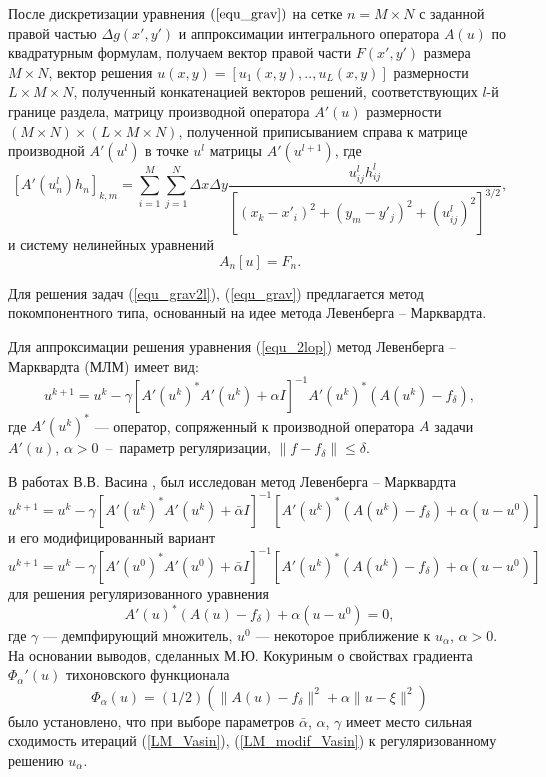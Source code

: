 После дискретизации уравнения $(\ref{equ_grav})$ на сетке $n=M\times N$ с заданной правой частью $\Delta g(x',y')$ и аппроксимации интегрального оператора $A(u)$ по квадратурным формулам, получаем вектор правой части $F(x',y')$ размера  $M\times N$, вектор решения $u(x,y)=[u_1(x,y),..,u_L(x,y)]$ размерности $L\times M\times N$, полученный конкатенацией векторов решений, соответствующих $l$-й границе раздела, матрицу производной оператора $A'(u)$ размерности $(M\times N)\times(L\times M\times N)$, полученной приписыванием справа к матрице производной $A'(u^l)$ в точке $u^l$ матрицы $A'(u^{l+1})$, где
\begin{equation}\label{op_grav_disc_form_mult}
[A'(u_n^l)h_n]_{k,m}=\sum\limits_{i=1}^{M}\sum\limits_{j=1}^{N}
\Delta x\Delta y\frac{u^l_{ij}h^l_{ij}}{[(x_k-x'_i)^2+(y_m-y'_j)^2+(u^l_{ij})^2]^{3/2}},
\end{equation} и систему нелинейных уравнений  
\begin{equation}\label{snl_equ}
A_n[u]=F_n.
\end{equation}

Для решения задач (\ref{equ_grav2l}), (\ref{equ_grav}) предлагается метод покомпонентного типа, основанный на идее метода Левенберга -- Марквардта. 

Для аппроксимации решения уравнения (\ref{equ_2lop}) метод Левенберга -- Марквардта (МЛМ) имеет вид:
\begin{equation}
u^{k+1}=u^k-\gamma[A'(u^k)^*A'(u^k)+\alpha I]^{-1} A'(u^k)^*(A(u^k)-f_\delta),
\end{equation}
где $A'(u^k)^*$ --- оператор, сопряженный к производной оператора $A$ задачи $A'(u)$, $\alpha>0$~--~параметр регуляризации, $\|f-f_\delta\|\le \delta.$
 
В работах В.В. Васина \cite{Vasin_2012}, \cite{VasPer_2011} был исследован метод Левенберга -- Марквардта
\begin{equation}\label{LM_Vasin}
u^{k+1}=u^k-\gamma[A'(u^k)^*A'(u^k)+\bar{\alpha} I]^{-1} [A'(u^k)^*(A(u^k)-f_\delta)+\alpha (u-u^0)]
\end{equation} и его модифицированный вариант
\begin{equation}\label{LM_modif_Vasin}
u^{k+1}=u^k-\gamma[A'(u^0)^*A'(u^0)+\bar{\alpha} I]^{-1} [A'(u^k)^*(A(u^k)-f_\delta)+\alpha (u-u^0)]
\end{equation} для решения регуляризованного уравнения
$$A'(u)^*(A(u)-f_\delta)+	\alpha (u-u^0)=0,$$
где $\gamma$ --- демпфирующий множитель, $u^0$ --- некоторое приближение к $u_\alpha$, $\alpha>0$. На основании выводов, сделанных М.Ю. Кокуриным \cite{Kok_2010} о свойствах градиента $\Phi_\alpha '(u)$ тихоновского функционала $$\Phi_\alpha(u)=(1/2)(\|A(u)-f_\delta\|^2+\alpha\|u-\xi\|^2)$$ было установлено, что при выборе параметров $\bar{\alpha}$, $\alpha$, $\gamma$ имеет место сильная сходимость итераций (\ref{LM_Vasin}), (\ref{LM_modif_Vasin}) к регуляризованному решению $u_\alpha$.

